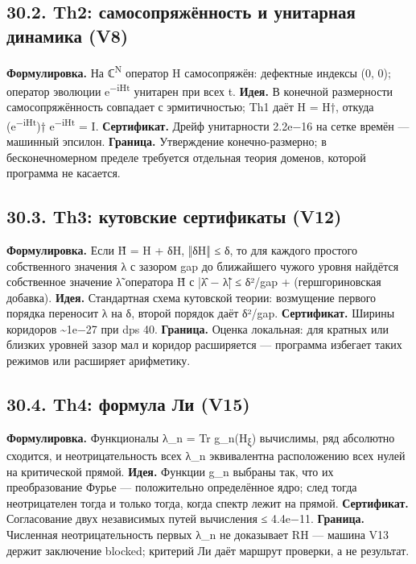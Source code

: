 \documentclass[11pt,a4paper]{article}
\begin{document}
\subsection{30.2. Th2: самосопряжённость и унитарная динамика (V8)}

\textbf{Формулировка.} На ℂ\textsuperscript{N} оператор H самосопряжён: дефектные индексы (0, 0); оператор эволюции e\textsuperscript{−iHt} унитарен при всех t. \textbf{Идея.} В конечной размерности самосопряжённость совпадает с эрмитичностью; Th1 даёт H = H†, откуда (e\textsuperscript{−iHt})† e\textsuperscript{−iHt} = I. \textbf{Сертификат.} Дрейф унитарности 2.2e−16 на сетке времён — машинный эпсилон. \textbf{Граница.} Утверждение конечно-размерно; в бесконечномерном пределе требуется отдельная теория доменов, которой программа не касается.

\subsection{30.3. Th3: кутовские сертификаты (V12)}

\textbf{Формулировка.} Если H̃ = H + δH, ‖δH‖ ≤ δ, то для каждого простого собственного значения λ с зазором gap до ближайшего чужого уровня найдётся собственное значение λ̃ оператора H̃ с |λ̂ − λ̃| ≤ δ²/gap + (гершгориновская добавка). \textbf{Идея.} Стандартная схема кутовской теории: возмущение первого порядка переносит λ на δ, второй порядок даёт δ²/gap. \textbf{Сертификат.} Ширины коридоров \textasciitilde{}1e−27 при dps 40. \textbf{Граница.} Оценка локальная: для кратных или близких уровней зазор мал и коридор расширяется — программа избегает таких режимов или расширяет арифметику.

\subsection{30.4. Th4: формула Ли (V15)}

\textbf{Формулировка.} Функционалы λ\_n = Tr g\_n(H\textsubscript{ξ}) вычислимы, ряд абсолютно сходится, и неотрицательность всех λ\_n эквивалентна расположению всех нулей на критической прямой. \textbf{Идея.} Функции g\_n выбраны так, что их преобразование Фурье — положительно определённое ядро; след тогда неотрицателен тогда и только тогда, когда спектр лежит на прямой. \textbf{Сертификат.} Согласование двух независимых путей вычисления ≤ 4.4e−11. \textbf{Граница.} Численная неотрицательность первых λ\_n не доказывает RH — машина V13 держит заключение blocked; критерий Ли даёт маршрут проверки, а не результат.
\end{document}
